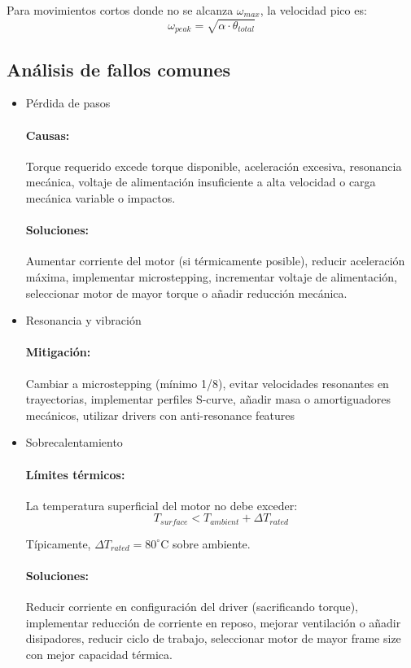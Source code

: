 Para movimientos cortos donde no se alcanza $\omega_{max}$, la velocidad pico es:
\begin{equation}
\omega_{peak} = \sqrt{\alpha \cdot \theta_{total}}
\end{equation}

\subsection{Análisis de fallos comunes}
\begin{itemize}

    \item{Pérdida de pasos}

\paragraph{Causas:}Torque requerido excede torque disponible, aceleración excesiva, resonancia mecánica, voltaje de alimentación insuficiente a alta velocidad o carga mecánica variable o impactos.

\paragraph{Soluciones:}Aumentar corriente del motor (si térmicamente posible), reducir aceleración máxima, implementar microstepping, incrementar voltaje de alimentación, seleccionar motor de mayor torque o añadir reducción mecánica.

    \item{Resonancia y vibración}

\paragraph{Mitigación:}Cambiar a microstepping (mínimo 1/8), evitar velocidades resonantes en trayectorias, implementar perfiles S-curve, añadir masa o amortiguadores mecánicos, utilizar drivers con anti-resonance features

    \item {Sobrecalentamiento}

\paragraph{Límites térmicos:}La temperatura superficial del motor no debe exceder:
\begin{equation}
T_{surface} < T_{ambient} + \Delta T_{rated}
\end{equation}

Típicamente, $\Delta T_{rated} = 80^\circ$C sobre ambiente.

\paragraph{Soluciones:}Reducir corriente en configuración del driver (sacrificando torque), implementar reducción de corriente en reposo, mejorar ventilación o añadir disipadores, reducir ciclo de trabajo, seleccionar motor de mayor frame size con mejor capacidad térmica.
\end{itemize}

